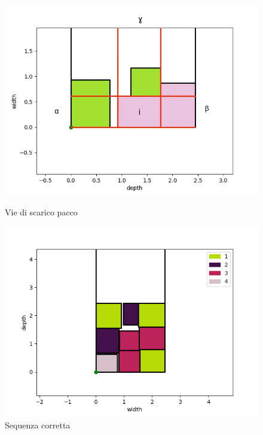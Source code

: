 \begin{figure}[H]
	\centering
	\begin{minipage}{.5\textwidth}
		\centering
		\includegraphics[width=1.\linewidth]{figures/abg_2drs}
		\caption[Vie scaricamento pacco]{Vie di scarico pacco}  
		\label{fig:abg_2drs}
	\end{minipage}%
	\begin{minipage}{.5\textwidth}
		\centering
		\includegraphics[width=1.\linewidth]{figures/2d3d}
		\caption[corretta sequenza di scarico]{Sequenza corretta}  
		\label{fig:2drs_abg}
	\end{minipage}
\end{figure}

